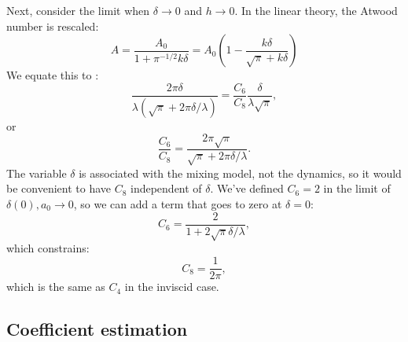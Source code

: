 Next, consider the limit when $\delta \rightarrow 0 $ and $h \rightarrow 0$.
In the linear theory, the Atwood number is rescaled:
\begin{equation}
A = \frac{A_0}{1 + \pi^{-1/2} k \delta} = A_0 \left(1 - \frac{k \delta}{\sqrt{\pi} + k \delta}\right)
\end{equation}
We equate this to :
\begin{equation}
\frac{2 \pi \delta}{\lambda (\sqrt{\pi} + 2 \pi \delta / \lambda)} = \frac{C_6 }{C_8}\frac{\delta}{\lambda \sqrt{\pi} },
\end{equation}
or
\begin{equation}
\frac{C_6}{C_8} = \frac{2 \pi \sqrt{\pi}}{\sqrt{\pi} + 2 \pi \delta / \lambda}.
\end{equation}
The variable $\delta$ is associated with the mixing model, not the dynamics, so it would be convenient to have $C_8$ independent of $\delta$.
We've defined $C_6 = 2$ in the limit of $\delta(0), a_0 \rightarrow 0$, so we can add a term that goes to zero at $\delta = 0$:
\begin{equation}
C_6 = \frac{2}{1 + 2 \sqrt{\pi} \delta / \lambda},
\end{equation}
which constrains:
\begin{equation}
C_8 = \frac{1}{2\pi},
\end{equation}
which is the same as $C_4$ in the inviscid case.

\subsection{Coefficient estimation}


